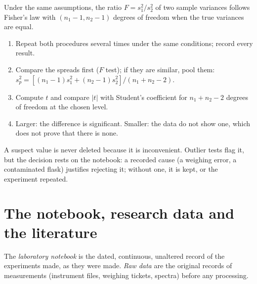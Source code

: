 \begin{proposition}[$F$ test]\label{prop:b3:lab-techniques-3:f-test}
Under the same assumptions, the ratio $F = s_1^2/s_2^2$ of two sample variances follows
Fisher's law with $(n_1 - 1, n_2 - 1)$ degrees of freedom when the true variances are equal.
\admitted
\end{proposition}

\begin{method}\label{met:b3:lab-techniques-3:compare-means}
\begin{enumerate}
  \item Repeat both procedures several times under the same conditions; record
        every result.
  \item Compare the spreads first ($F$ test); if they are similar, pool them:
        $s_p^2 = [(n_1 - 1)s_1^2 + (n_2 - 1)s_2^2]/(n_1 + n_2 - 2)$.
  \item Compute $t$ and compare $|t|$ with Student's coefficient for $n_1 + n_2 - 2$ degrees of
        freedom at the chosen level.
  \item Larger: the difference is significant. Smaller: the data do not show one,
        which does not prove that there is none.
\end{enumerate}
\end{method}

A suspect value is never deleted because it is inconvenient. Outlier tests
flag it, but the decision rests on the notebook: a recorded cause (a weighing
error, a contaminated flask) justifies rejecting it; without one, it is kept,
or the experiment repeated.

\section{The notebook, research data and the literature}

\begin{definition}\label{def:b3:lab-techniques-3:notebook}
The \emph{laboratory notebook} is the dated,
continuous, unaltered record of the experiments made, as they were made. \emph{Raw
data} are the original records of measurements (instrument
files, weighing tickets, spectra) before any processing.
\end{definition}

